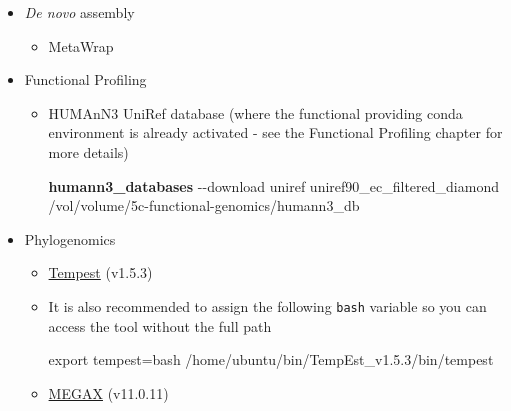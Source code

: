 \documentclass[
  letterpaper,
]{book}
\newenvironment{Shaded}{}{}
\newcommand{\AttributeTok}[1]{\textcolor[rgb]{0.84,0.23,0.29}{#1}}
\newcommand{\BuiltInTok}[1]{\textcolor[rgb]{0.84,0.23,0.29}{#1}}
\newcommand{\ExtensionTok}[1]{\textcolor[rgb]{0.84,0.23,0.29}{\textbf{#1}}}
\newcommand{\FunctionTok}[1]{\textcolor[rgb]{0.44,0.26,0.76}{#1}}
\newcommand{\NormalTok}[1]{\textcolor[rgb]{0.14,0.16,0.18}{#1}}
\newcommand{\OperatorTok}[1]{\textcolor[rgb]{0.14,0.16,0.18}{#1}}
\newcommand{\StringTok}[1]{\textcolor[rgb]{0.01,0.18,0.38}{#1}}
\newcommand{\VariableTok}[1]{\textcolor[rgb]{0.89,0.38,0.04}{#1}}
\providecommand{\tightlist}{%
  \setlength{\itemsep}{0pt}\setlength{\parskip}{0pt}}\usepackage{longtable,booktabs,array}
\begin{document}
\begin{itemize}
\tightlist
\item
  \emph{De novo} assembly

  \begin{itemize}
  \tightlist
  \item
    MetaWrap
  \end{itemize}

\begin{Shaded}
\end{Shaded}
\item
  Functional Profiling

  \begin{itemize}
  \item
    HUMAnN3 UniRef database (where the functional providing conda
    environment is already activated - see the Functional Profiling
    chapter for more details)

\begin{Shaded}
\begin{Highlighting}[]
\ExtensionTok{humann3\_databases} \AttributeTok{{-}{-}download}\NormalTok{ uniref uniref90\_ec\_filtered\_diamond /vol/volume/5c{-}functional{-}genomics/humann3\_db}
\end{Highlighting}
\end{Shaded}
  \end{itemize}
\item
  Phylogenomics

  \begin{itemize}
  \item
    \href{http://tree.bio.ed.ac.uk/download.html?name=tempest\&id=102\&num=3}{Tempest}
    (v1.5.3)
  \item
    It is also recommended to assign the following \texttt{bash}
    variable so you can access the tool without the full path

\begin{Shaded}
\begin{Highlighting}[]
\BuiltInTok{export} \VariableTok{tempest}\OperatorTok{=}\StringTok{\textquotesingle{}bash /home/ubuntu/bin/TempEst\_v1.5.3/bin/tempest\textquotesingle{}}
\end{Highlighting}
\end{Shaded}
  \item
    \href{https://www.megasoftware.net}{MEGAX} (v11.0.11)
  \end{itemize}
\end{itemize}
\end{document}
